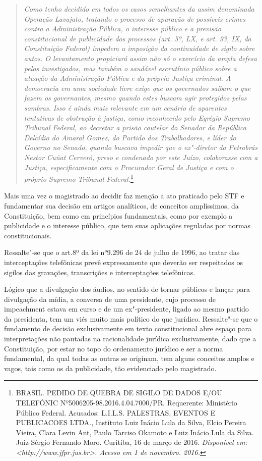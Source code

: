 {\begin{quote}
\emph{Como tenho decidido em todos os casos semelhantes da assim
denominada Operação Lavajato, tratando o processo de apuração de
possíveis crimes contra a Administração Pública, o interesse público e a
previsão constitucional de publicidade dos processos (art. 5º, LX, e
art. 93, IX, da Constituição Federal) impedem a imposição da
continuidade de sigilo sobre autos. O levantamento propiciará assim não
só o exercício da ampla defesa pelos investigados, mas também o saudável
escrutínio público sobre a atuação da Administração Pública e da própria
Justiça criminal. A democracia em uma sociedade livre exige que os
governados saibam o que fazem os governantes, mesmo quando estes buscam
agir protegidos pelas sombras.} \emph{Isso é ainda mais relevante em um
cenário de aparentes tentativas de obstrução à justiça, como reconhecido
pelo Egrégio Supremo Tribunal Federal, ao decretar a prisão cautelar do
Senador da República Delcídio do Amaral Gomez, do Partido dos
Trabalhadores, e líder do Governo no Senado, quando buscava impedir que
o ex"-diretor da Petrobrás Nestor Cuñat Cerveró, preso e condenado por
este Juízo, colaborasse com a Justiça, especificamente com o Procurador
Geral de Justiça e com o próprio Supremo Tribunal Federal.}\footnote{BRASIL.
  PEDIDO DE QUEBRA DE SIGILO DE DADOS E/OU TELEFÔNIC
  Nº5006205-98.2016.4.04.7000/PR. Requerente: Ministério Público
  Federal. Acusados: L.I.L.S. PALESTRAS, EVENTOS E PUBLICACOES LTDA.,
  Instituto Luiz Inácio Lula da Silva, Elcio Pereira Vieira, Clara Levin
  Ant, Paulo Tarciso Okamoto e Luiz Inácio Lula da Silva. Juiz Sérgio
  Fernando Moro. Curitiba, 16 de março de 2016. \emph{Disponível em:
  \textless{}http://www.jfpr.jus.br\textgreater{}. Acesso em 1 de
  novembro. 2016.}}
\end{quote}

Mais uma vez o magistrado ao decidir faz menção a ato praticado pelo STF
e fundamentar sua decisão em artigos analíticos, de conceitos
amplíssimos, da Constituição, bem como em princípios fundamentais, como
por exemplo a publicidade e o interesse público, que tem suas aplicações
reguladas por normas constitucionais.

Ressalte"-se que o art.8º da lei n°9.296 de 24 de julho de 1996, ao
tratar das interceptações telefônicas prevê expressamente que deverão
ser respeitados os sigilos das gravações, transcrições e interceptações
telefônicas.

Lógico que a divulgação dos áudios, no sentido de tornar públicos e
lançar para divulgação da mídia, a conversa de uma presidente, cujo
processo de impeachment estava em curso e de um ex"-presidente, ligado ao
mesmo partido da presidenta, tem um viés muito mais político do que
jurídico. Ressalte"-se que o fundamento de decisão exclusivamente em
texto constitucional abre espaço para interpretações não pautadas na
racionalidade jurídica exclusivamente, dado que a Constituição, por
estar no topo do ordenamento jurídico e ser a norma fundamental, da qual
todas as outras se originam, tem alguns conceitos amplos e vagos, tais
como os da publicidade, tão evidenciado pelo magistrado.

}
